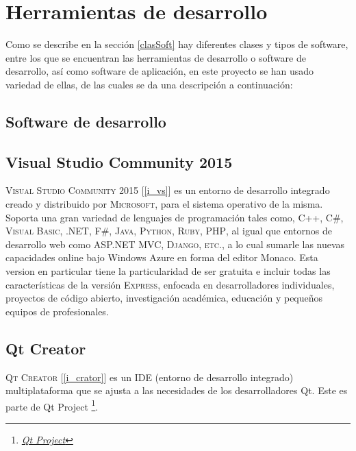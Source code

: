 \documentclass[12pt]{book} %
\begin{document}
\section{Herramientas de desarrollo}
	Como se describe en la sección \ref{clasSoft} hay diferentes clases y tipos de software, entre los que se encuentran las herramientas
	de 	desarrollo o software de desarrollo, así como software de aplicación, en este proyecto se han usado variedad de ellas, de las 
	cuales se da una descripción a continuación:
	\subsection*{Software de desarrollo}	
	\subsection{Visual Studio Community 2015 \label{VS}}
		\textsc{Visual Studio Community 2015} [\ref{i_vs}] es un entorno de desarrollo integrado creado y distribuido por \textsc{Microsoft}, 
		para el sistema operativo de la misma.
		Soporta una gran variedad de lenguajes de programación tales como, \textsc{ C++, C\#, Visual Basic, .NET, F\#, Java, Python, 
		Ruby, PHP}, al igual que entornos de desarrollo web como \textsc{ASP.NET MVC, Django, etc.,} a lo cual sumarle las nuevas
		capacidades online bajo Windows Azure en forma del editor Monaco.
		Esta version en particular tiene la particularidad de ser gratuita e incluir todas las características de la versión 
		\textsc{Express}, enfocada en desarrolladores individuales, proyectos de código abierto, investigación académica, educación
		y pequeños equipos  de profesionales.
		
	\subsection{Qt Creator \label{qt}}
		\textsc{Qt Creator} [\ref{i_crator}] es un IDE (entorno de desarrollo integrado) multiplataforma que se ajusta a las necesidades de los 
		desarrolladores Qt. 
		Este es parte de Qt Project \footnote{\textit{\scriptsize \href{http://www.qt.io/}{Qt Project}}}.
		
\end{document}
